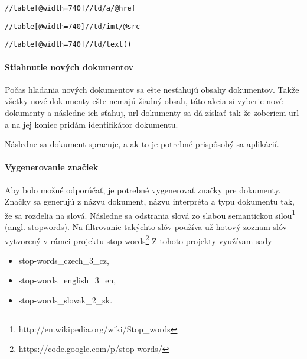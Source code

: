 \begin{lstlisting}[caption=XPath na vyhľadanie názvou piesni,label=lst:document_id]
//table[@width=740]//td/a/@href
\end{lstlisting}

\begin{lstlisting}[caption=XPath na vyhľadanie názvou piesni,label=lst:document_type]
//table[@width=740]//td/imt/@src
\end{lstlisting}

\begin{lstlisting}[caption=XPath na vyhľadanie názvou piesni,label=lst:document_interpret]
//table[@width=740]//td/text()
\end{lstlisting}

\paragraph{Stiahnutie nových dokumentov}

Počas hľadania nových dokumentov sa ešte nesťahujú obsahy dokumentov. Takže 
všetky nové dokumenty ešte nemajú žiadný obsah, táto akcia si vyberie nové dokumenty
a následne ich sťahuj, url dokumenty sa dá získať tak že zoberiem url
 a na jej
koniec pridám identifikátor dokumentu.

Následne sa dokument spracuje, a ak to je potrebné prispôsobý sa aplikácií.

\paragraph{Vygenerovanie značiek}

Aby bolo možné odporúčať, je potrebné vygenerovať značky pre dokumenty. Značky
sa generujú z názvu dokument, názvu interpréta a typu dokumentu tak, že sa rozdelia na
slová. Následne sa odstrania slová zo slabou semantickou 
silou\footnote{http://en.wikipedia.org/wiki/Stop\_words}  (angl. stopwords).
Na filtrovanie takýchto slóv používa už hotový zoznam slóv vytvorený v rámci 
projektu stop-words\footnote{https://code.google.com/p/stop-words/}
Z tohoto projekty využívam sady

\begin{itemize}
\item{stop-words\_czech\_3\_cz,}
\item{stop-words\_english\_3\_en,}
\item{stop-words\_slovak\_2\_sk.}
\end{itemize}

